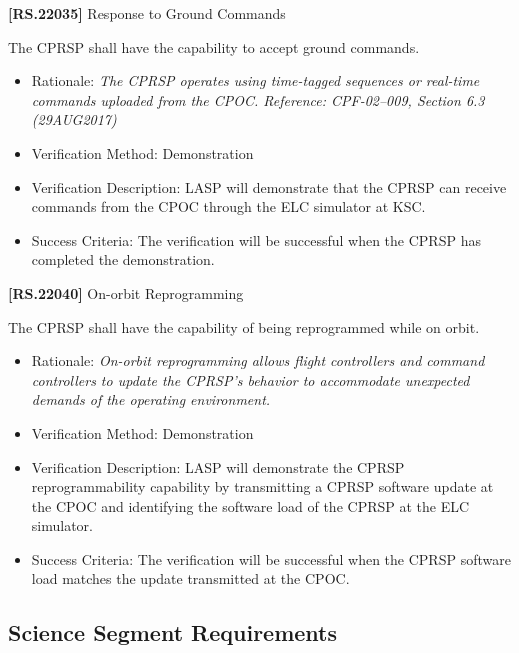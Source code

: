 \textbf{[RS.22035]} Response to Ground Commands

The \gls{CPRSP} shall have the capability to accept ground commands.

\begin{itemize}
\item{} Rationale: \emph{The CPRSP operates using time-tagged sequences or real-time commands uploaded from the CPOC. Reference: CPF-02--009, Section 6.3 (29AUG2017)}

\item{} Verification Method: Demonstration

\item{} Verification Description: \gls{LASP} will demonstrate that the \gls{CPRSP} can receive commands from the \gls{CPOC} through the \gls{ELC} simulator at \gls{KSC}.

\item{} Success Criteria: The verification will be successful when the \gls{CPRSP} has completed the \gls{demonstration}.

\end{itemize}

\textbf{[RS.22040]} On-orbit Reprogramming

The \gls{CPRSP} shall have the capability of being reprogrammed while on orbit.

\begin{itemize}
\item{} Rationale: \emph{On-orbit reprogramming allows flight controllers and command controllers to update the CPRSP's behavior to accommodate unexpected demands of the operating environment.}

\item{} Verification Method: Demonstration

\item{} Verification Description: \gls{LASP} will demonstrate the \gls{CPRSP} reprogrammability capability by transmitting a \gls{CPRSP} software update at the \gls{CPOC} and identifying the software load of the \gls{CPRSP} at the \gls{ELC} simulator.

\item{} Success Criteria: The verification will be successful when the \gls{CPRSP} software load matches the update transmitted at the \gls{CPOC}.

\end{itemize}

\subsection{Science Segment Requirements}
\label{sciencesegmentrequirements}

